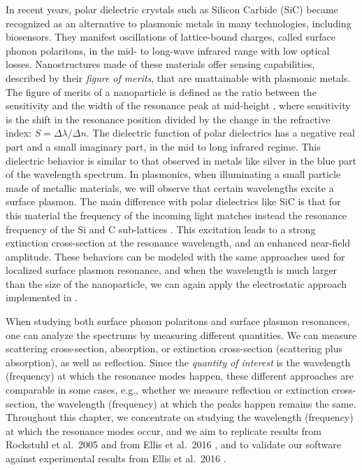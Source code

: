 In recent years, polar dielectric crystals such as Silicon Carbide (SiC) became recognized as an alternative to 
plasmonic metals in many technologies, including biosensors. They manifest oscillations of lattice-bound charges, called surface 
phonon polaritons, in the mid- to long-wave infrared range with low optical losses. Nanostructures made of these materials offer sensing 
capabilities, described by their \emph{figure of merits}, that are unattainable with plasmonic metals. The figure of merits of a nanoparticle
is defined as the ratio between the sensitivity and the width of the resonance peak at mid-height \cite{otte2012}, where 
sensitivity is the shift in the resonance position divided by the change in the refractive index: 
$S = \Delta \lambda / \Delta n$.
The dielectric function of polar dielectrics has a negative real part and a small imaginary part, in the mid to long infrared regime. 
This dielectric behavior is similar to that observed in metals like silver in the blue part of the wavelength spectrum. 
In plasmonics, when illuminating a small particle made of metallic materials, we will observe that certain wavelengths excite a surface plasmon. 
The main difference with polar dielectrics like SiC is that for this material the frequency of the incoming light matches instead the resonance 
frequency of the Si and C sub-lattices \cite{caldwell2015,rockstuhl2005}. This excitation leads to a strong extinction cross-section at the 
resonance wavelength, and an enhanced near-field amplitude. These behaviors can be modeled with the same approaches used for localized surface plasmon 
resonance, and when the wavelength is much larger than the size of the nanoparticle, we can again apply the electrostatic approach 
implemented in \pygbe \cite{ClementiETal2017, ClementiETal2019}.

When studying both surface phonon polaritons and surface plasmon resonances, one can analyze the spectrums by measuring different quantities. 
We can measure scattering cross-section, absorption, or extinction cross-section (scattering plus absorption), as well as reflection. 
Since the \textit{quantity of interest} is the wavelength (frequency) at which the resonance modes happen, 
these different approaches are comparable in some cases, e.g., whether we measure reflection or extinction cross-section, the 
wavelength (frequency) at which the peaks happen remains the same. 
Throughout this chapter, we concentrate on studying the wavelength (frequency) at which the resonance modes occur, 
and we aim to replicate results from Rockstuhl et al.\ 2005 \cite{rockstuhl2005} and from Ellis et al.\ 2016 \cite{ellis2016}, 
and to validate our software against experimental results from Ellis et al.\ 2016 \cite{ellis2016}.
